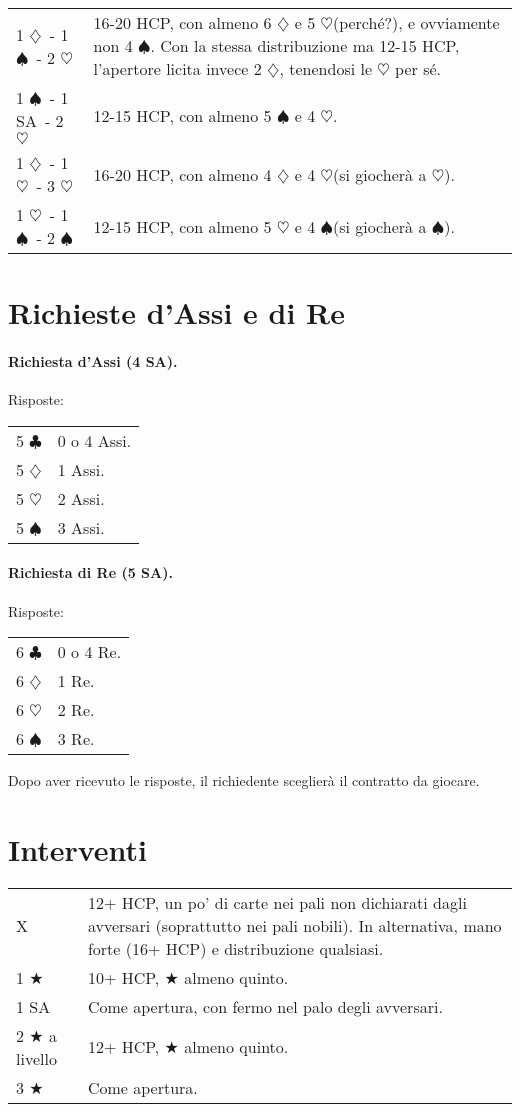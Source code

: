 \documentclass[a4paper,10pt]{article}
\renewcommand{\c}{$\clubsuit$\xspace}
\renewcommand{\d}{$\diamondsuit$\xspace}
\newcommand{\h}{$\heartsuit$\xspace}
\newcommand{\s}{$\spadesuit$\xspace}
\renewcommand{\j}{$\bigstar$\xspace}
\newcommand{\sa}{SA\xspace}
\newcommand{\smallspace}{\vskip0.3cm}
\newenvironment{twocol}
  {\smallspace\noindent\begin{tabular}{l p{0.78\textwidth}}}
  {\end{tabular}\smallspace}
\begin{document}
\begin{twocol}
1 \d\ - 1 \s\ - 2 \h & 16-20 HCP, con almeno 6 \d e 5 \h (perché?), e ovviamente non 4 \s. Con la stessa distribuzione ma 12-15 HCP, l'apertore licita invece 2 \d, tenendosi le \h per sé.\\
1 \s\ - 1 \sa\ - 2 \h & 12-15 HCP, con almeno 5 \s e 4 \h.\\
1 \d\ - 1 \h\ - 3 \h & 16-20 HCP, con almeno 4 \d e 4 \h (si giocherà a \h).\\
1 \h\ - 1 \s\ - 2 \s & 12-15 HCP, con almeno 5 \h e 4 \s (si giocherà a \s).
\end{twocol}


\section{Richieste d'Assi e di Re}

\paragraph{Richiesta d'Assi (4 \sa).} Risposte:

\begin{twocol}
5 \c & 0 o 4 Assi.\\
5 \d & 1 Assi.\\
5 \h & 2 Assi.\\
5 \s & 3 Assi.
\end{twocol}

\paragraph{Richiesta di Re (5 \sa).} Risposte:

\begin{twocol}
6 \c & 0 o 4 Re.\\
6 \d & 1 Re.\\
6 \h & 2 Re.\\
6 \s & 3 Re.
\end{twocol}

Dopo aver ricevuto le risposte, il richiedente sceglierà il contratto da giocare. 


\section{Interventi}

\begin{twocol}
  X & 12+ HCP, un po' di carte nei pali non dichiarati dagli avversari (soprattutto nei pali nobili). In alternativa, mano forte (16+ HCP) e distribuzione qualsiasi.\\
  1 \j & 10+ HCP, \j almeno quinto.\\
  1 \sa & Come apertura, con fermo nel palo degli avversari.\\
  2 \j a livello & 12+ HCP, \j almeno quinto.\\
  3 \j & Come apertura.
\end{twocol}
\end{document}
